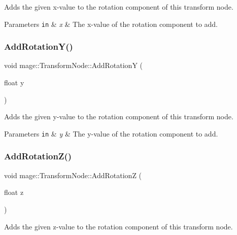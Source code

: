 Adds the given x-\/value to the rotation component of this transform node.


\begin{DoxyParams}[1]{Parameters}
\mbox{\tt in}  & {\em x} & The x-\/value of the rotation component to add. \\
\hline
\end{DoxyParams}
\hypertarget{classmage_1_1_transform_node_a23af3e48d4d330678199773eb5343215}{}\label{classmage_1_1_transform_node_a23af3e48d4d330678199773eb5343215} 
\subsubsection{\texorpdfstring{Add\+Rotation\+Y()}{AddRotationY()}}
{\footnotesize\ttfamily void mage\+::\+Transform\+Node\+::\+Add\+RotationY (\begin{DoxyParamCaption}\item[{float}]{y }\end{DoxyParamCaption})}

Adds the given y-\/value to the rotation component of this transform node.


\begin{DoxyParams}[1]{Parameters}
\mbox{\tt in}  & {\em y} & The y-\/value of the rotation component to add. \\
\hline
\end{DoxyParams}
\hypertarget{classmage_1_1_transform_node_acd425b01721efb584c43840cd41486fb}{}\label{classmage_1_1_transform_node_acd425b01721efb584c43840cd41486fb} 
\subsubsection{\texorpdfstring{Add\+Rotation\+Z()}{AddRotationZ()}}
{\footnotesize\ttfamily void mage\+::\+Transform\+Node\+::\+Add\+RotationZ (\begin{DoxyParamCaption}\item[{float}]{z }\end{DoxyParamCaption})}

Adds the given z-\/value to the rotation component of this transform node.


